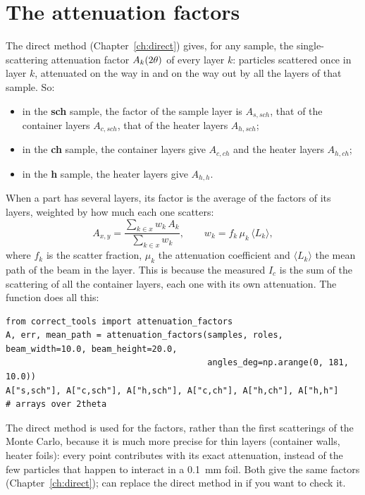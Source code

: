 \section{The attenuation factors}

The direct method (Chapter~\ref{ch:direct}) gives, for any sample, the single-scattering attenuation factor $A_k(2\theta)$ of
every layer $k$: particles scattered once in layer $k$, attenuated on the way in and on the way out by all the layers of that sample.
So:
\begin{itemize}
  \item in the \textbf{sch} sample, the factor of the sample layer is $A_{s,sch}$, that of the container layers $A_{c,sch}$, that of the
        heater layers $A_{h,sch}$;
  \item in the \textbf{ch} sample, the container layers give $A_{c,ch}$ and the heater layers $A_{h,ch}$;
  \item in the \textbf{h} sample, the heater layers give $A_{h,h}$.
\end{itemize}
When a part has several layers, its factor is the average of the factors of its layers, weighted by how much each one scatters:
\begin{equation}
  A_{x,y} = \frac{\sum_{k\in x} w_k\, A_k}{\sum_{k\in x} w_k}, \qquad w_k = f_k\,\mu_k\,\langle L_k\rangle ,
  \label{eq:weights}
\end{equation}
where $f_k$ is the scatter fraction, $\mu_k$ the attenuation coefficient and $\langle L_k\rangle$ the mean path of the beam in the
layer. This is because the measured $I_c$ is the sum of the scattering of all the container layers, each one with its own
attenuation. The function  does all this:
\begin{lstlisting}
from correct_tools import attenuation_factors
A, err, mean_path = attenuation_factors(samples, roles, beam_width=10.0, beam_height=20.0,
                                        angles_deg=np.arange(0, 181, 10.0))
A["s,sch"], A["c,sch"], A["h,sch"], A["c,ch"], A["h,ch"], A["h,h"]    # arrays over 2theta
\end{lstlisting}
The direct method is used for the factors, rather than the first scatterings of the Monte Carlo, because it is much more precise
for thin layers (container walls, heater foils): every point contributes with its exact attenuation, instead of the few particles that
happen to interact in a 0.1~mm foil. Both give the same factors (Chapter~\ref{ch:direct});  can replace the
direct method in  if you want to check it.

